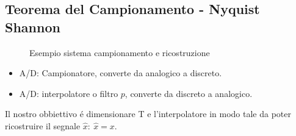     \subsection{Teorema del Campionamento - Nyquist Shannon}\label{Teorema del Campionamento - Nyquist Shannon}
        \begin{figure}[H]
            \centering
            \label{fig:Sistema di campionamento e ricostruzione}
            \caption{Esempio sistema campionamento e ricostruzione}
        \end{figure}
        \begin{itemize}
            \item {
                A/D: Campionatore, converte da analogico a discreto.
            }
            \item {
                A/D: interpolatore o filtro $p$, converte da discreto a analogico.
            }
        \end{itemize}
        Il nostro obbiettivo é dimensionare T e l'interpolatore in modo tale da poter ricostruire il segnale $\hat{x}:\ \hat{x} =x$.
